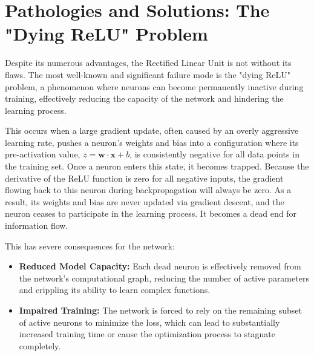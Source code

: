 \section{Pathologies and Solutions: The "Dying ReLU" Problem}
\label{sec:dying_relu}

Despite its numerous advantages, the Rectified Linear Unit is not without its flaws. The most well-known and significant failure mode is the "dying ReLU" problem, a phenomenon where neurons can become permanently inactive during training, effectively reducing the capacity of the network and hindering the learning process.

This occurs when a large gradient update, often caused by an overly aggressive learning rate, pushes a neuron's weights and bias into a configuration where its pre-activation value, $z = \mathbf{w} \cdot \mathbf{x} + b$, is consistently negative for all data points in the training set. Once a neuron enters this state, it becomes trapped. Because the derivative of the ReLU function is zero for all negative inputs, the gradient flowing back to this neuron during backpropagation will always be zero. As a result, its weights and bias are never updated via gradient descent, and the neuron ceases to participate in the learning process. It becomes a dead end for information flow.

This has severe consequences for the network:
\begin{itemize}
    \item \textbf{Reduced Model Capacity:} Each dead neuron is effectively removed from the network's computational graph, reducing the number of active parameters and crippling its ability to learn complex functions.
    \item \textbf{Impaired Training:} The network is forced to rely on the remaining subset of active neurons to minimize the loss, which can lead to substantially increased training time or cause the optimization process to stagnate completely.
\end{itemize}

